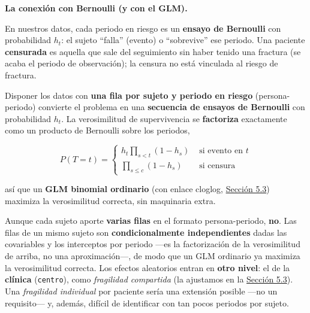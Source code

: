 \documentclass[
  letterpaper,
  DIV=11,
  numbers=noendperiod]{scrartcl}
\begin{document}
\textbf{La conexión con Bernoulli (y con el GLM).}

En nuestros datos, cada periodo en riesgo es un \textbf{ensayo de
Bernoulli} con probabilidad \(h_t\): el sujeto ``falla'' (evento) o
``sobrevive'' ese periodo. Una paciente \textbf{censurada} es aquella
que sale del seguimiento sin haber tenido una fractura (se acaba el
periodo de observación); la censura no está vinculada al riesgo de
fractura.

Disponer los datos con \textbf{una fila por sujeto y periodo en riesgo}
(persona-periodo) convierte el problema en una \textbf{secuencia de
ensayos de Bernoulli} con probabilidad \(h_t\). La verosimilitud de
supervivencia se \textbf{factoriza} exactamente como un producto de
Bernoulli sobre los periodos,

\[ P(T=t)=\begin{cases}
h_t \prod_{s<t} (1-h_s) & \text{ si evento en } t\\
\prod_{s \leq c} (1-h_s) & \text{ si censura}
\end{cases}\]

así que un \textbf{GLM binomial ordinario} (con enlace cloglog,
\protect\hyperlink{sec-u15-glm}{Sección 5.3}) maximiza la verosimilitud
correcta, sin maquinaria extra.

\begin{tcolorbox}[enhanced jigsaw, breakable, colframe=quarto-callout-note-color-frame, left=2mm, arc=.35mm, colbacktitle=quarto-callout-note-color!10!white, toprule=.15mm, colback=white, coltitle=black, rightrule=.15mm, opacitybacktitle=0.6, title=\textcolor{quarto-callout-note-color}{\faInfo}\hspace{0.5em}{¿Hace falta un efecto aleatorio por paciente?}, titlerule=0mm, toptitle=1mm, bottomtitle=1mm, leftrule=.75mm, bottomrule=.15mm, opacityback=0]

Aunque cada sujeto aporte \textbf{varias filas} en el formato
persona-periodo, \textbf{no}. Las filas de un mismo sujeto son
\textbf{condicionalmente independientes} dadas las covariables y los
interceptos por periodo ---es la factorización de la verosimilitud de
arriba, no una aproximación---, de modo que un GLM ordinario ya maximiza
la verosimilitud correcta. Los efectos aleatorios entran en \textbf{otro
nivel}: el de la \textbf{clínica} (\texttt{centro}), como
\emph{fragilidad compartida} (la ajustamos en la
\protect\hyperlink{sec-u15-glm}{Sección 5.3}). Una \emph{fragilidad
individual} por paciente sería una extensión posible ---no un
requisito--- y, además, difícil de identificar con tan pocos periodos
por sujeto.

\end{tcolorbox}
\end{document}
